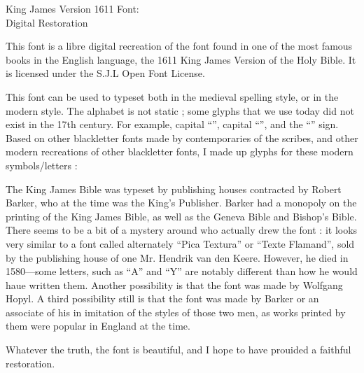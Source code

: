 \documentclass[border=15pt]{standalone}
\begin{document}
\begin{minipage}{4in}
\setlength{\parindent}{10pt}
\setlength{\parskip}{3ex plus 0.5ex minus 0.2ex}
    \begin{center}
{\huge{King James Version 1611 Font:\\Digital Restoration}}
    \end{center}

This font is a libre digital recreation of the font found in one of the most famous books in the English language, the 1611 King James Version of the Holy Bible. It is licensed under the S.J.L Open Font License.

This font can be used to typeset both in the medieval spelling style, or in the modern style. The alphabet is not static ; some glyphs that we use today did not exist in the 17th century. For example, capital “{}”, capital “{}”, and the “{}” sign. Based on other blackletter fonts made by contemporaries of the scribes, and other modern recreations of other blackletter fonts, I made up glyphs for these modern symbols/letters : {}

The King James Bible was typeset by publishing houses contracted by Robert Barker, who at the time was the King’s Publisher. Barker had a monopoly on the printing of the King James Bible, as well as the Geneva Bible and Bishop’s Bible. There seems to be a bit of a mystery around who actually drew the font : it looks very similar to a font called alternately “Pica Textura” or “Texte Flamand”, sold by the publishing house of one Mr. Hendrik van den Keere. However, he died in 1580---some letters, such as “A” and “Y” are notably different than how he would haue written them. Another possibility is that the font was made by Wolfgang Hopyl. A third possibility still is that the font was made by Barker or an associate of his in imitation of the styles of those two men, as works printed by them were popular in England at the time.

Whatever the truth, the font is beautiful, and I hope to have prouided a faithful restoration.


\end{minipage}
\end{document}

